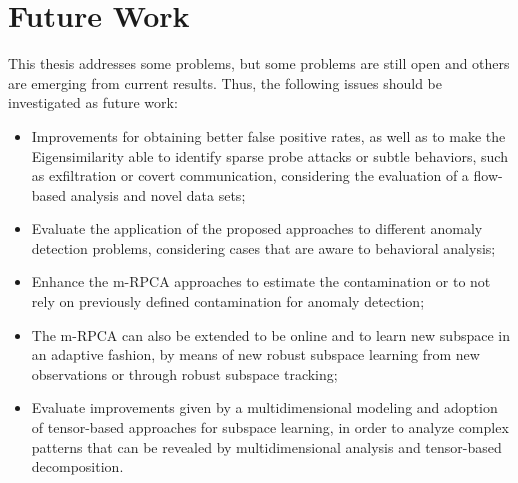 \section{Future Work}
\label{sec:5_conc_futurework}

This thesis addresses some problems, but some problems are still open and others are emerging from current results. Thus, the following issues should be investigated as future work:

\begin{itemize}
	\item Improvements for obtaining better false positive rates, as well as to make the Eigensimilarity able to identify sparse probe attacks or subtle behaviors, such as exfiltration or covert communication, considering the evaluation of a flow-based analysis and novel data sets;
	\item Evaluate the application of the proposed approaches to different anomaly detection problems, considering cases that are aware to behavioral analysis;
	\item Enhance the m-RPCA approaches to estimate the contamination or to not rely on previously defined contamination for anomaly detection;
	\item The m-RPCA can also be extended to be online and to learn new subspace in an adaptive fashion, by means of new robust subspace learning from new observations or through robust subspace tracking;
	\item Evaluate improvements given by a multidimensional modeling and adoption of tensor-based approaches for subspace learning, in order to analyze complex patterns that can be revealed by multidimensional analysis and tensor-based decomposition.
\end{itemize}
